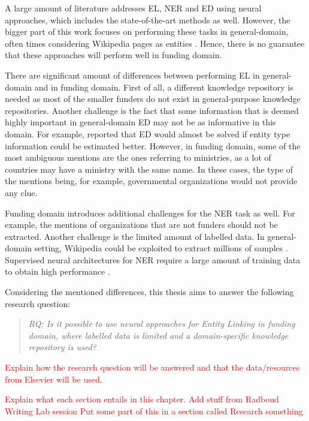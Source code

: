 \documentclass{report}
\theoremstyle{definition}
\theoremstyle{remark}
\begin{document}
A large amount of literature addresses EL, NER and ED using neural approaches, which includes the state-of-the-art methods \cite{REL,LUKE,mulang} as well. However, the bigger part of this work focuses on performing these tasks in general-domain, often times considering Wikipedia pages as entities \cite{nlpnotes}. Hence, there is no guarantee that these approaches will perform well in funding domain.

There are significant amount of differences between performing EL in general-domain and in funding domain. First of all, a different knowledge repository is needed as most of the smaller funders do not exist in general-purpose knowledge repositories.  Another challenge is the fact that some information that is deemed highly important in general-domain ED may not be as informative in this domain. For example, \cite{raiman} reported that ED would almost be solved if entity type information could be estimated better. However, in funding domain, some of the most ambiguous mentions are the ones referring to ministries, as a lot of countries may have a ministry with the same name. In these cases, the type of the mentions being, for example, governmental organizations would not provide any clue. 

Funding domain introduces additional challenges for the NER task as well. For example, the mentions of organizations that are not funders should not be extracted. Another challenge is the limited amount of labelled data. In general-domain setting, Wikipedia could be exploited to extract millions of samples \cite{bunescu-pasca-2006-using}. Supervised neural architectures for NER require a large amount of training data to obtain high performance \cite{NERsurvey}.

Considering the mentioned differences, this thesis aims to answer the following research question:

\begin{quote}\emph{RQ: Is it possible to use neural approaches for Entity Linking in funding domain, where labelled data is limited and a domain-specific knowledge repository is used?}\end{quote}

\textcolor{red}{Explain how the research question will be answered and that the data/resources from Elsevier will be used.}

\textcolor{red}{Explain what each section entails in this chapter.}
\textcolor{red}{Add stuff from Radboud Writing Lab session}
\textcolor{red}{Put some part of this in a section called Research something}
\newpage
\end{document}
